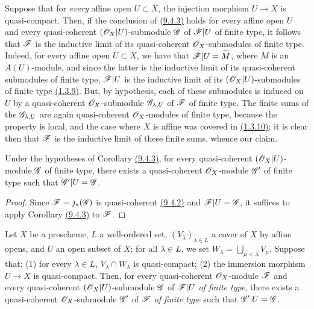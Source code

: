 \begin{rmk}[9.4.4]
\label{rmk-1.9.4.4}
Suppose that for {\it every} affine open $U\subset X$, the injection morphism $U\to X$ is
quasi-compact. Then, if the conclusion of \hyperref[cor-1.9.4.3]{(9.4.3)} holds for every affine open $U$
and every quasi-coherent $(\mathscr{O}_X|U)$-submodule $\mathscr{G}$ of $\mathscr{F}|U$ of finite type, it
follows
that $\mathscr{F}$ is the inductive limit of its quasi-coherent $\mathscr{O}_X$-submodules of finite type.
Indeed, for every affine open $U\subset X$, we have that $\mathscr{F}|U=\widetilde{M}$, where $M$
is an $A(U)$-module, and since the latter is the inductive limit of its quasi-coherent
submodules of finite type, $\mathscr{F}|U$ is the inductive limit of its $(\mathscr{O}_X|U)$-submodules of
finite type \hyperref[cor-1.1.3.9]{(1.3.9)}. But, by hypothesis, each of these submodules is induced on $U$
by a quasi-coherent $\mathscr{O}_X$-submodule $\mathscr{G}_{\lambda,U}$ of $\mathscr{F}$ of finite type. The
finite sums of the $\mathscr{G}_{\lambda,U}$ are again quasi-coherent $\mathscr{O}_X$-modules of finite
type, because the property is local, and the case where $X$ is affine was covered in
\hyperref[env-1.1.3.10]{(1.3.10)}; it is clear then that $\mathscr{F}$ is the inductive limit of these finite
sums, whence our claim.
\end{rmk}

\begin{cor}[9.4.5]
\label{cor-1.9.4.5}
Under the hypotheses of Corollary \hyperref[cor-1.9.4.3]{(9.4.3)}, for every quasi-coherent $(\mathscr{O}_X|U)$-module
$\mathscr{G}$ of finite type, there exists a quasi-coherent $\mathscr{O}_X$-module $\mathscr{G}'$ of finite
type such that $\mathscr{G}'|U=\mathscr{G}$.
\end{cor}

\begin{proof}
\label{proof-cor-1.9.4.5}
Since $\mathscr{F}=j_*(\mathscr{G})$ is quasi-coherent \hyperref[prop-1.9.4.2]{(9.4.2)} and $\mathscr{F}|U=\mathscr{G}$, it
suffices to apply Corollary \hyperref[cor-1.9.4.3]{(9.4.3)} to $\mathscr{F}$.
\end{proof}

\begin{lem}[9.4.6]
\label{lem-1.9.4.6}
Let $X$ be a prescheme, $L$ a well-ordered set, $(V_\lambda)_{\lambda\in L}$ a cover of $X$
by affine opens, and $U$ an open subset of $X$; for all $\lambda\in L$, we set
$W_\lambda=\bigcup_{\mu<\lambda}V_\mu$. Suppose that: (1) for every $\lambda\in L$,
$V_\lambda\cap W_\lambda$ is quasi-compact; (2) the immersion morphism $U\to X$ is
quasi-compact. Then, for every quasi-coherent $\mathscr{O}_X$-module $\mathscr{F}$ and every
quasi-coherent $(\mathscr{O}_X|U)$-submodule $\mathscr{G}$ of $\mathscr{F}|U$ {\it of finite type}, there
exists a quasi-coherent $\mathscr{O}_X$-submodule $\mathscr{G}'$ of $\mathscr{F}$ {\it of finite type} such
that $\mathscr{G}'|U=\mathscr{G}$.
\end{lem}

